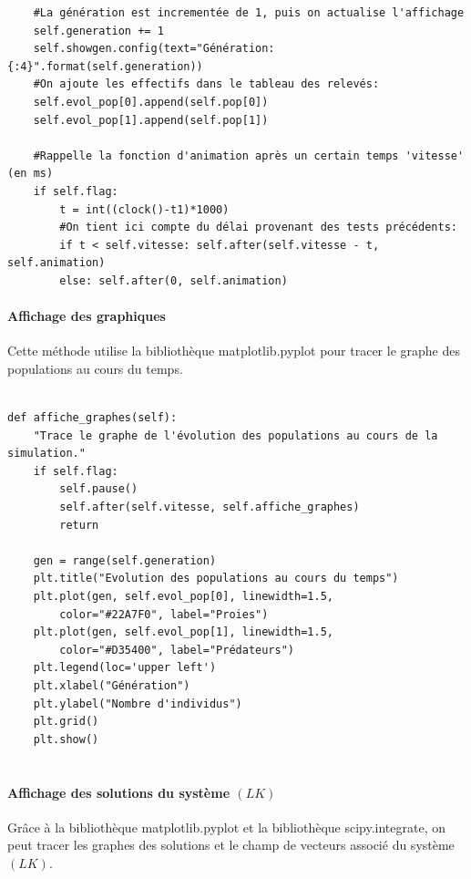 \documentclass[11pt]{article}
\begin{document}
\begin{verbatim}
    #La génération est incrementée de 1, puis on actualise l'affichage
    self.generation += 1    
    self.showgen.config(text="Génération: {:4}".format(self.generation))
    #On ajoute les effectifs dans le tableau des relevés:
    self.evol_pop[0].append(self.pop[0])  
    self.evol_pop[1].append(self.pop[1])
    
    #Rappelle la fonction d'animation après un certain temps 'vitesse' (en ms)
    if self.flag:        
        t = int((clock()-t1)*1000)
        #On tient ici compte du délai provenant des tests précédents:
        if t < self.vitesse: self.after(self.vitesse - t, self.animation)   
        else: self.after(0, self.animation)

\end{verbatim}

\paragraph{Affichage des graphiques}
Cette méthode utilise la bibliothèque \textsf{matplotlib.pyplot} pour tracer le graphe des populations au cours du temps.

\begin{verbatim}
        
def affiche_graphes(self):
    "Trace le graphe de l'évolution des populations au cours de la simulation."
    if self.flag:   
        self.pause()
        self.after(self.vitesse, self.affiche_graphes)
        return
        
    gen = range(self.generation)
    plt.title("Evolution des populations au cours du temps")
    plt.plot(gen, self.evol_pop[0], linewidth=1.5, 
        color="#22A7F0", label="Proies")
    plt.plot(gen, self.evol_pop[1], linewidth=1.5, 
        color="#D35400", label="Prédateurs")
    plt.legend(loc='upper left')
    plt.xlabel("Génération")
    plt.ylabel("Nombre d'individus")
    plt.grid()
    plt.show()
    
\end{verbatim}

\paragraph{Affichage des solutions du système $(LK)$}
Grâce à la bibliothèque \textsf{matplotlib.pyplot} et la bibliothèque \textsf{scipy.integrate}, on peut tracer les graphes des solutions et le champ de vecteurs associé du système $(LK)$.
\end{document}
